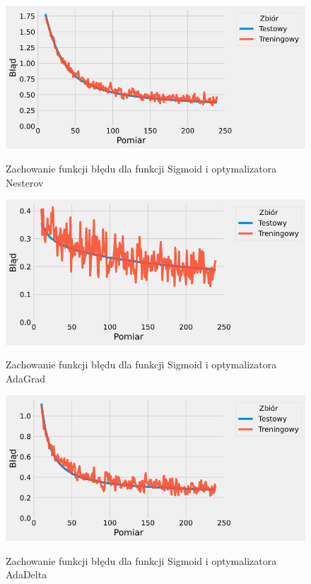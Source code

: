 \documentclass{article}
\begin{document}
\begin{figure}[H]
	\centering
	\caption{Zachowanie funkcji błędu dla funkcji Sigmoid i optymalizatora Nesterov}
	\includegraphics[width=\textwidth]{sig_nes_err.png}
	\label{fig:res113}
\end{figure}
\begin{figure}[H]
	\centering
	\caption{Zachowanie funkcji błędu dla funkcji Sigmoid i optymalizatora AdaGrad}
	\includegraphics[width=\textwidth]{sig_grad_err.png}
	\label{fig:res114}
\end{figure}
\begin{figure}[H]
	\centering
	\caption{Zachowanie funkcji błędu dla funkcji Sigmoid i optymalizatora AdaDelta}
	\includegraphics[width=\textwidth]{sig_delta_err.png}
	\label{fig:res115}
\end{figure}
\end{document}
